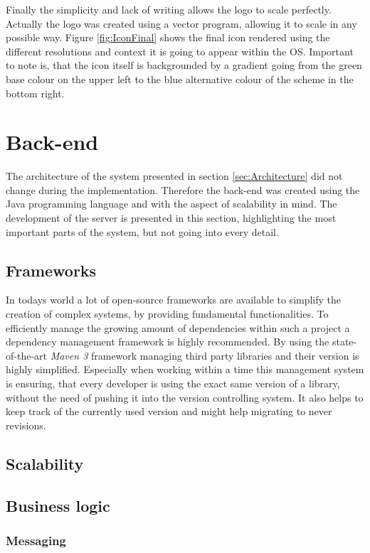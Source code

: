 Finally the simplicity and lack of writing allows the logo to scale perfectly. Actually the logo was created using a vector program, allowing it to scale in any possible way. Figure \vref{fig:IconFinal} shows the final icon rendered using the different resolutions and context it is going to appear within the \gls{OS}. Important to note is, that the icon itself is backgrounded by a gradient going from the green base colour on the upper left to the blue alternative colour of the scheme in the bottom right.

\section{Back-end}
The architecture of the system presented in section \vref{sec:Architecture} did not change during the implementation. Therefore the back-end was created using the Java programming language and with the aspect of scalability in mind. The development of the server is presented in this section, highlighting the most important parts of the system, but not going into every detail.

\subsection{Frameworks}
\label{sec:FrameworksServer}

In todays world a lot of open-source frameworks are available to simplify the creation of complex systems, by providing fundamental functionalities. To efficiently manage the growing amount of dependencies within such a project a dependency management framework is highly recommended. By using the state-of-the-art \emph{Maven 3} framework managing third party libraries and their version is highly simplified. Especially when working within a time this management system is ensuring, that every developer is using the exact same version of a library, without the need of pushing it into the version controlling system. It also helps to keep track of the currently used version and might help migrating to never revisions.

\subsection{Scalability}
\subsection{Business logic}
\subsubsection{Messaging}
